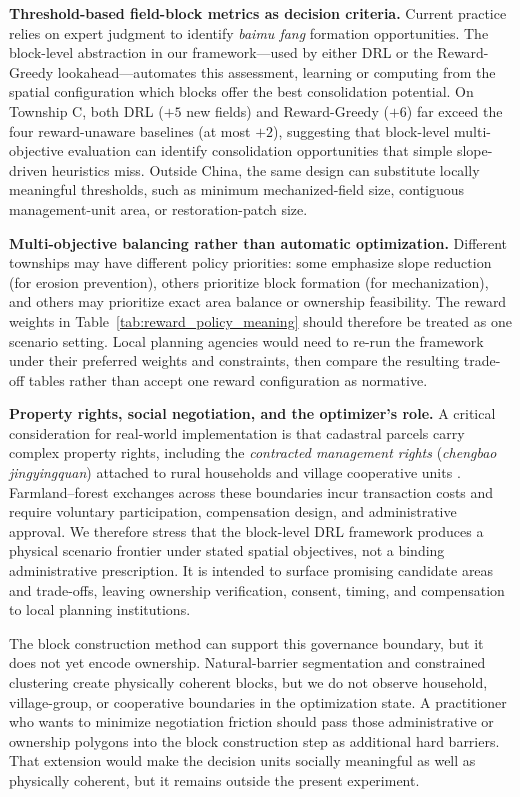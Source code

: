 \documentclass[preprint,12pt]{elsarticle}
\begin{document}
\textbf{Threshold-based field-block metrics as decision criteria.} Current practice relies on expert judgment to identify \textit{baimu fang} formation opportunities. The block-level abstraction in our framework---used by either DRL or the Reward-Greedy lookahead---automates this assessment, learning or computing from the spatial configuration which blocks offer the best consolidation potential. On Township C, both DRL ($+5$ new fields) and Reward-Greedy ($+6$) far exceed the four reward-unaware baselines (at most $+2$), suggesting that block-level multi-objective evaluation can identify consolidation opportunities that simple slope-driven heuristics miss. Outside China, the same design can substitute locally meaningful thresholds, such as minimum mechanized-field size, contiguous management-unit area, or restoration-patch size.

\textbf{Multi-objective balancing rather than automatic optimization.} Different townships may have different policy priorities: some emphasize slope reduction (for erosion prevention), others prioritize block formation (for mechanization), and others may prioritize exact area balance or ownership feasibility. The reward weights in Table~\ref{tab:reward_policy_meaning} should therefore be treated as one scenario setting. Local planning agencies would need to re-run the framework under their preferred weights and constraints, then compare the resulting trade-off tables rather than accept one reward configuration as normative.

\textbf{Property rights, social negotiation, and the optimizer's role.} A critical consideration for real-world implementation is that cadastral parcels carry complex property rights, including the \textit{contracted management rights} (\textit{chengbao jingyingquan}) attached to rural households and village cooperative units \citep{wu2005consolidation}. Farmland--forest exchanges across these boundaries incur transaction costs and require voluntary participation, compensation design, and administrative approval. We therefore stress that the block-level DRL framework produces a physical scenario frontier under stated spatial objectives, not a binding administrative prescription. It is intended to surface promising candidate areas and trade-offs, leaving ownership verification, consent, timing, and compensation to local planning institutions.

The block construction method can support this governance boundary, but it does not yet encode ownership. Natural-barrier segmentation and constrained clustering create physically coherent blocks, but we do not observe household, village-group, or cooperative boundaries in the optimization state. A practitioner who wants to minimize negotiation friction should pass those administrative or ownership polygons into the block construction step as additional hard barriers. That extension would make the decision units socially meaningful as well as physically coherent, but it remains outside the present experiment.
\end{document}
